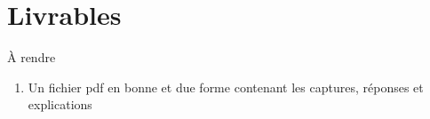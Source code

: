 \documentclass[10pt,a4paper]{article}
\begin{document}
\section*{Livrables}

\begin{infobox}{À rendre}
\begin{enumerate}
\item Un fichier pdf en bonne et due forme contenant les captures, réponses et explications
\end{enumerate}

\end{infobox}
\end{document}
